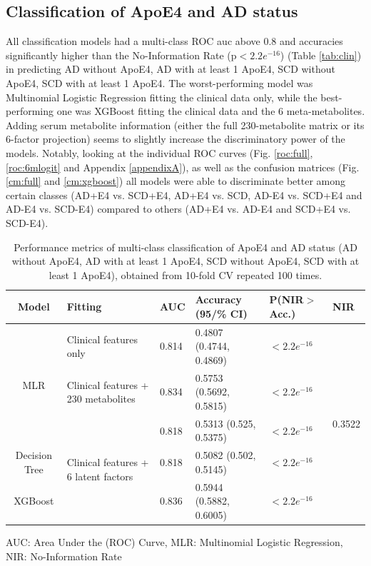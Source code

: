 \documentclass{amsart}
\begin{document}
\subsection{Classification of ApoE4 and AD status}
All classification models had a multi-class ROC \acrshort{auc} above 0.8 and accuracies significantly higher than the No-Information Rate (p$<2.2e^{-16}$) (Table \ref{tab:clin}) in predicting AD without ApoE4, AD with at least 1 ApoE4, SCD without ApoE4, SCD with at least 1 ApoE4. The worst-performing model was  Multinomial Logistic Regression fitting the clinical data only, while the best-performing one was XGBoost fitting the clinical data and the 6 meta-metabolites. Adding serum metabolite information (either the full 230-metabolite matrix or its 6-factor projection) seems to slightly increase the discriminatory power of the models.
Notably, looking at the individual ROC curves (Fig. \ref{roc:full}, \ref{roc:6mlogit} and Appendix \ref{appendixA}), as well as the confusion matrices (Fig. \ref{cm:full} and \ref{cm:xgboost}) all models were able to discriminate better among certain classes (AD+E4 vs. SCD+E4, AD+E4 vs. SCD, AD-E4 vs. SCD+E4 and AD-E4 vs. SCD-E4) compared to others (AD+E4 vs. AD-E4 and SCD+E4 vs. SCD-E4).
\begin{table}[H]
  \centering
\caption{Performance metrics of multi-class classification of ApoE4 and AD status (AD without ApoE4, AD with at least 1 ApoE4, SCD without ApoE4, SCD with at least 1 ApoE4), obtained from 10-fold CV repeated 100 times.} 
\label{tab:class_results}
\begin{threeparttable}
\begin{tabular}{clllll}\toprule
Model  & Fitting & AUC & Accuracy (95/\% CI) & P(NIR$>$Acc.) & NIR \\ \midrule
\multirow{3}{*}{MLR} & Clinical features only & 0.814 & 0.4807 (0.4744, 0.4869) & $<2.2e^{-16}$ & \multirow{5}{*}{0.3522} \\
& Clinical features + 230 metabolites & 0.834 & 0.5753 (0.5692, 0.5815) & $<2.2e^{-16}$ &  \\
& \multirow{3}{*}{Clinical features + 6 latent factors} & 0.818 & 0.5313 (0.525, 0.5375) & $<2.2e^{-16}$ &  \\
Decision Tree & & 0.818 & 0.5082 (0.502, 0.5145) & $<2.2e^{-16}$ &  \\
XGBoost & & 0.836 & 0.5944 (0.5882, 0.6005) & $<2.2e^{-16}$ &  \\ \bottomrule
\end{tabular}
\begin{tablenotes}
  \item[]  AUC: Area Under the (ROC) Curve, MLR: Multinomial Logistic Regression, NIR: No-Information Rate
\end{tablenotes}
\end{threeparttable}
\end{table}
\end{document}
